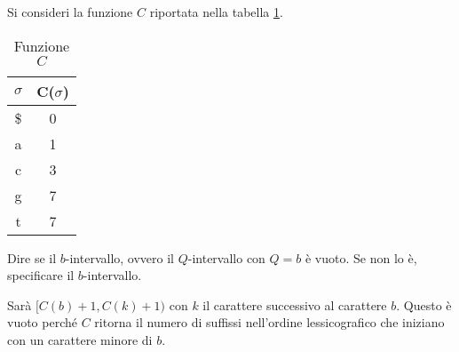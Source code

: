 \begin{esempio}
    Si consideri la funzione $C$ riportata nella tabella \ref{tab:esempioC}.
    \begin{table}[!ht]
        \centering
        \begin{tabular}{|c|c|}
            \hline
            $\sigma$ & C($\sigma$) \\ \hline
            \$       & 0           \\ \hline
            a        & 1           \\ \hline
            c        & 3           \\ \hline
            g        & 7           \\ \hline
            t        & 7           \\ \hline
        \end{tabular}
        \caption{Funzione $C$}
        \label{tab:esempioC}
    \end{table}
    Dire se il $b$-intervallo, ovvero il $Q$-intervallo con $Q=b$ è vuoto. Se non
    lo è, specificare il $b$-intervallo.

    Sarà $[C(b)+1, C(k)+1)$ con $k$ il carattere successivo al carattere $b$.
    Questo è vuoto perché $C$ ritorna il numero di suffissi nell'ordine
    lessicografico che iniziano con un carattere minore di $b$.
\end{esempio}
